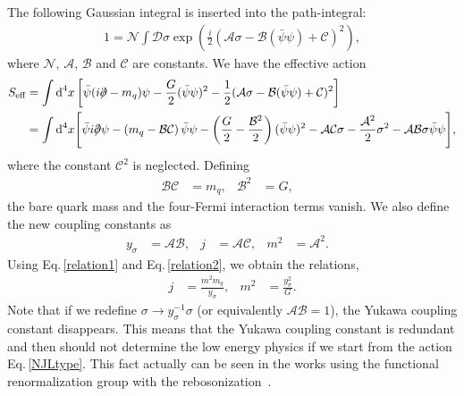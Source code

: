 \documentclass[a4paper,preprint,superscriptaddress,preprintnumbers,nofootinbib]{revtex4}
\newcommand{\Slash}[1]{{\ooalign{\hfil/\hfil\crcr$#1$}}}
\newcommand{\al}[1]{\begin{align}#1\end{align}}
\newcommand{\nn}{\nonumber\\}
\newcommand{\p}{\partial}
\newcommand{\df}{\text{d}}
\newcommand{\fn}[1]{\!\left(#1\right)}
\begin{document}
\begin{appendix}
The following Gaussian integral is inserted into the path-integral:
\al{
1={\mathcal N}\int {\mathcal D}\sigma \exp\fn{\frac{i}{2}({\mathcal A}\sigma - {\mathcal B}(\bar \psi\psi) + {\mathcal C})^2},
}
where ${\mathcal N}$, ${\mathcal A}$, ${\mathcal B}$ and ${\mathcal C}$ are constants.
We have the effective action
\al{
S_\text{eff}
&=\int \df^4x   
\left[ \bar \psi (i\Slash \p - m_q) \psi - \frac{G}{2}(\bar \psi\psi)^2 -\frac{1}{2}({\mathcal A}\sigma -{\mathcal B}(\bar \psi\psi) + {\mathcal C})^2  \right]\nn
&=\int \df^4x
\Bigg[ \bar \psi i\Slash \p\psi - \left(m_q-{\mathcal B}{\mathcal C}\right)\bar \psi\psi -\left( \frac{G}{2}-\frac{{\mathcal B}^2}{2}  \right)(\bar \psi\psi)^2 
-{\mathcal A}{\mathcal C}\sigma -\frac{{\mathcal A}^2}{2}\sigma^2 -{\mathcal A}{\mathcal B}\sigma {\bar \psi}\psi
 \Bigg],
 \label{bosonized action}
}
where the constant ${\mathcal C}^2$ is neglected.
Defining 
\al{
{\mathcal B}{\mathcal C}&=m_q,&
{\mathcal B}^2 &=G,&
\label{relation1}
}
the bare quark mass and the four-Fermi interaction terms vanish. 
We also define the new coupling constants as
\al{
y_\sigma&={\mathcal A}{\mathcal B},&
j&={\mathcal A}{\mathcal C},&
m^2&={\mathcal A}^2.&
\label{relation2}
}
Using Eq.\,\eqref{relation1} and Eq.\,\eqref{relation2}, we obtain the relations,
\al{
j&=\frac{m^2m_q}{y_\sigma},&
m^2&=\frac{y_\sigma^2}{G}.
\label{relation3}
}
Note that if we redefine $\sigma \to y_\sigma^{-1} \sigma$ (or equivalently ${\mathcal A}{\mathcal B}=1$), the Yukawa coupling constant disappears.
This means that the Yukawa coupling constant is redundant and then should not determine the low energy physics if we start from the action Eq.\,\eqref{NJLtype}.
This fact actually can be seen in the works using the functional renormalization group with the rebosonization~\cite{Mitter:2014wpa,Braun:2014ata}.



\end{appendix}
\end{document}
